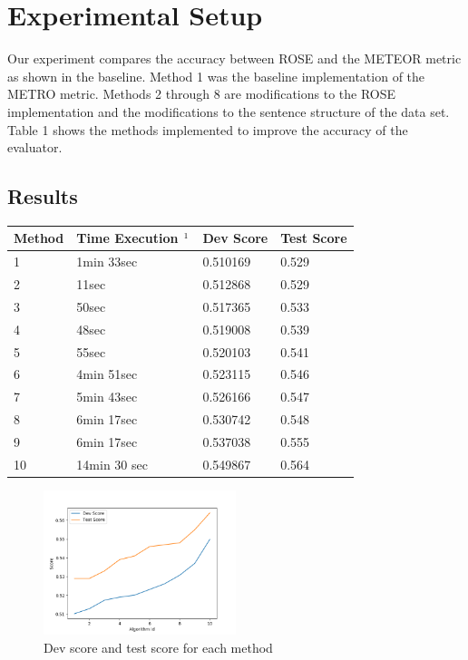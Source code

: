 \documentclass[11pt,letterpaper]{article}
\begin{document}
\section{Experimental Setup}

Our experiment compares the accuracy between ROSE and the METEOR metric as shown in the baseline. Method 1 was the baseline implementation of the METRO metric. Methods 2 through 8 are modifications to the ROSE implementation  \cite{song2011regression} and the modifications to the sentence structure of the data set. 
Table 1 shows the methods implemented to improve the accuracy of the evaluator.

	

\subsection{Results}

\begin{center}
	\begin{tabular}{| l | l | l | p{1cm} |}
	\hline
	Method & Time Execution $\footnotemark[1] $& Dev Score & Test Score \\ \hline
	1 & 1min 33sec & 0.510169 & 0.529 \\ \hline
	2 & 11sec & 0.512868 & 0.529 \\ \hline
	3 & 50sec & 0.517365 & 0.533 \\ \hline
	4 & 48sec & 0.519008 & 0.539 \\ \hline
	5 & 55sec & 0.520103 & 0.541 \\ \hline
	6 & 4min 51sec & 0.523115 & 0.546 \\ \hline
	7 & 5min 43sec & 0.526166 & 0.547 \\ \hline
	8 & 6min 17sec & 0.530742 & 0.548 \\ \hline
	9 & 6min 17sec & 0.537038 & 0.555 \\ \hline
	10 & 14min 30 sec & 0.549867 & 0.564 \\ \hline
	\end{tabular}
\end{center}

\begin{figure}
  \caption{Dev score and test score for each method}
    \includegraphics[width=0.5\textwidth]{Figure_1}
\end{figure}
\end{document}

